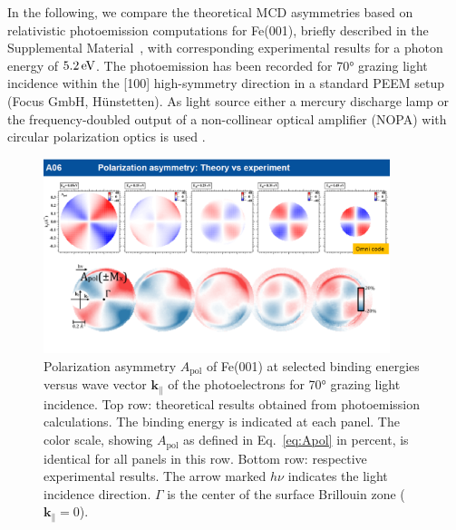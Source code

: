 \documentclass[prl,twocolumn,floatfix]{revtex4-2}
\renewcommand{\vec}[1]{\boldsymbol{#1}}
\begin{document}
In the following, we compare the theoretical MCD asymmetries based on relativistic photoemission computations for Fe(001), briefly described in the Supplemental Material~\cite{Supplement}, with corresponding experimental results for a photon energy of $\unit[5.2]{eV}$. The photoemission has been recorded for 70° grazing light incidence within the [100] high-symmetry direction in a standard PEEM setup (Focus GmbH, Hünstetten). As light source either a mercury discharge lamp or the frequency-doubled output of a non-collinear optical amplifier (NOPA) with circular polarization optics is used \cite{duncker2012,gillmeister2020, paleschke2021}. 

\begin{figure}
    \centering
    \includegraphics[width = 0.9\textwidth]{Apol}
    \caption{Polarization asymmetry $A_{\mathrm{pol}}$ of Fe(001) at selected binding energies versus wave vector $\vec{k}_{\parallel}$ of the photoelectrons for 70° grazing light incidence. Top row: theoretical results obtained from photoemission calculations. The binding energy is indicated at each panel. The color scale, showing $A_{\mathrm{pol}}$ as defined in Eq.~\eqref{eq:Apol} in percent, is identical for all panels in this row. Bottom row: respective experimental results. The arrow marked $h \nu$ indicates the light incidence direction. $\Gamma$ is the center of the surface Brillouin zone ($\vec{k}_{\parallel} = 0$).}
    \label{fig:Apol}
\end{figure}
\end{document}
